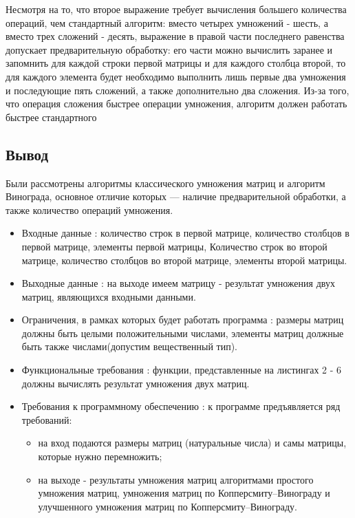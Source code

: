 Несмотря на то, что второе выражение требует вычисления большего количества операций, чем стандартный алгоритм: вместо четырех умножений - шесть, а вместо трех сложений - десять, выражение в правой части последнего равенства допускает предварительную обработку: его части можно вычислить заранее и запомнить для каждой строки первой матрицы и для каждого столбца второй, то для каждого элемента будет необходимо выполнить лишь первые два умножения и последующие пять сложений, а также дополнительно два сложения. Из-за того, что операция сложения быстрее операции умножения, алгоритм должен работать быстрее стандартного

\subsection{Вывод}

Были рассмотрены алгоритмы классического умножения матриц и алгоритм Винограда, основное отличие которых — наличие предварительной обработки, а также количество операций умножения.
\begin{itemize}
	\item Входные данные : количество строк в первой матрице, количество столбцов в первой матрице, элементы первой матрицы, Количество строк во второй матрице, количество столбцов во второй матрице, элементы второй матрицы.
	\item Выходные данные : на выходе имеем матрицу - результат умножения двух матриц, являющихся входными данными.
	\item Ограничения, в рамках которых будет работать программа : размеры матриц должны быть целыми положительными числами, элементы матриц должные быть также числами(допустим вещественный тип).
	\item Функциональные требования : функции, представленные на листингах 2 - 6 должны вычислять результат умножения двух матриц.
	\item Требования к программному обеспечению : к программе предъявляется ряд требований:
			\begin{itemize}
			    \item на вход подаются размеры матриц (натуральные числа) и самы матрицы, которые нужно перемножить;
			    \item на выходе - результаты умножения матриц алгоритмами простого умножения матриц, умножения матриц по Копперсмиту–Винограду и улучшенного умножения матриц по Копперсмиту–Винограду.
			\end{itemize}
\end{itemize}

